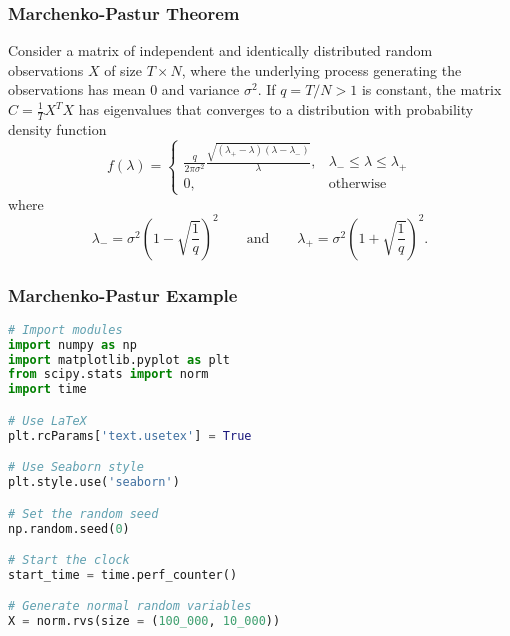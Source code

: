 \documentclass{beamer}
\begin{document}
\begin{frame}
\frametitle{Marchenko-Pastur Theorem}
\small
\begin{Theorem}
Consider a matrix of independent and identically distributed random observations $X$ of size $T\times N$, where the underlying process generating the observations has mean 0 and variance $\sigma^2$. If $q = T/N > 1$ is constant, the matrix $C = \frac{1}{T} X^T X$ has eigenvalues that converges to a distribution with probability density function
$$
f(\lambda) = \begin{cases} \frac{q}{2\pi\sigma^2} \frac{\sqrt{(\lambda_+ - \lambda)(\lambda - \lambda_-)}}{\lambda}, & \lambda_- \leq \lambda \leq \lambda_+\\ 0, & \text{otherwise}\end{cases}
$$
where
$$
\lambda_- = \sigma^2 \left(1 - \sqrt{\frac{1}{q}}\right)^2\qquad\text{and}\qquad \lambda_+ = \sigma^2 \left(1 + \sqrt{\frac{1}{q}}\right)^2.
$$
\end{Theorem}
\end{frame}

\begin{frame}[fragile]
\frametitle{Marchenko-Pastur Example}

\begin{lstlisting}[language=Python]
# Import modules
import numpy as np
import matplotlib.pyplot as plt
from scipy.stats import norm
import time

# Use LaTeX
plt.rcParams['text.usetex'] = True

# Use Seaborn style
plt.style.use('seaborn')

# Set the random seed
np.random.seed(0)

# Start the clock
start_time = time.perf_counter()

# Generate normal random variables
X = norm.rvs(size = (100_000, 10_000))

\end{lstlisting}
\end{frame}
\end{document}
